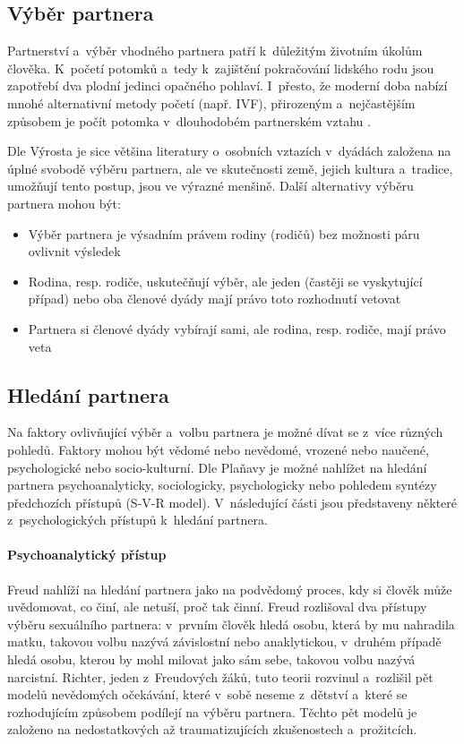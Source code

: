 \documentclass[a4paper, 12pt, notitlepage, oneside, numbers=noenddot]{report}
\begin{document}
\subsection{Výběr partnera}
Partnerství a~výběr vhodného partnera patří k~důležitým životním
úkolům člověka.  K~po\-če\-tí potomků a~tedy k~zajištění pokračování
lidského rodu jsou zapotřebí dva plodní jedinci opačného pohlaví.
I~přesto, že moderní doba nabízí mnohé alternativní metody početí
(např. IVF), přirozeným a~nejčastějším způsobem je počít potomka
v~dlouhodobém partnerském vztahu \citep{CSU2006}.

Dle Výrosta \citeyearpar{Vyrost2008} je sice většina literatury o~osobních
vztazích v~dyádách založena na úplné svobodě výběru partnera, ale ve
skutečnosti země, jejich kultura a~tradice, umožňují tento postup, jsou
ve výrazné menšině. Další alternativy výběru partnera mohou být:

\begin{itemize}
\item Výběr partnera je výsadním právem rodiny (rodičů) bez možnosti
  páru ovlivnit výsledek
\item Rodina, resp. rodiče, uskutečňují výběr, ale jeden (častěji se
  vyskytující případ) nebo oba členové dyády mají právo toto
  rozhodnutí vetovat
\item Partnera si členové dyády vybírají sami, ale rodina, resp. rodiče,
  mají právo veta
\end{itemize}

\subsection{Hledání partnera}
Na faktory ovlivňující výběr a~volbu partnera je možné dívat se z~více
různých pohledů.  Faktory mohou být vědomé nebo nevědomé, vrozené nebo
naučené, psychologické nebo socio-kulturní.  Dle Plaňavy \citeyearpar{Planava1998}
je možné nahlížet na hledání partnera psychoanalyticky, sociologicky,
psychologicky nebo pohledem syntézy předchozích přístupů (S-V-R
model).  V~následující části jsou představeny některé
z~psychologických přístupů k~hledání partnera.

\paragraph{Psychoanalytický přístup}
Freud \citep{Planava1998} nahlíží na hledání partnera jako na
podvědomý proces, kdy si člověk může uvědomovat, co činí, ale netuší,
proč tak činní.  Freud rozlišoval dva přístupy výběru sexuálního
partnera: v~prvním člověk hledá osobu, která by mu nahradila matku,
takovou volbu nazývá závislostní nebo anakly\-tic\-kou, v~druhém případě
hledá osobu, kterou by mohl milovat jako sám sebe, takovou volbu
nazývá narcistní.  Richter, jeden z~Freudových žáků, tuto teorii
rozvinul a~rozlišil pět modelů nevědomých očekávání, které v~sobě
neseme z~dětství a~které se rozhodujícím způsobem podílejí na výběru
partnera. Těchto pět modelů je založeno na nedostatkových až
traumatizujících zkušenostech a~prožitcích.
\end{document}
